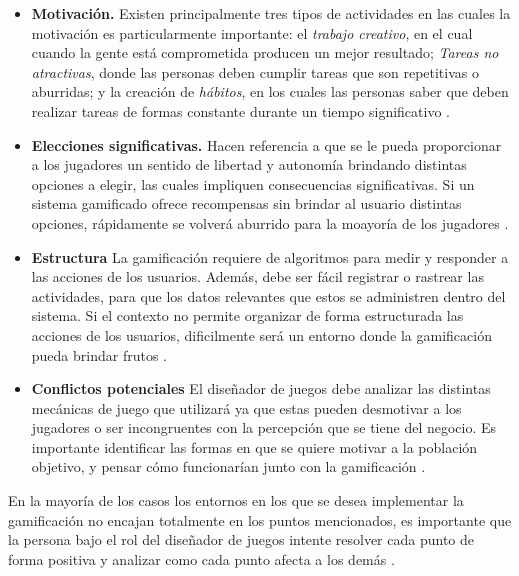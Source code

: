     \begin{itemize}
    \item
    {\bf Motivación.}
        Existen principalmente tres tipos de actividades en las cuales la motivación
        es particularmente importante: el {\em trabajo creativo}, en el cual cuando la gente
        está comprometida producen un mejor resultado; {\em Tareas no atractivas}, donde las
        personas deben cumplir tareas que son repetitivas o aburridas; y la creación de
        {\em hábitos}, en los cuales las personas saber que deben realizar tareas de formas
        constante durante un tiempo significativo \cite[p. 31]{ForTheWin}.
        \clearpage

    \item
    {\bf Elecciones significativas.}
        Hacen referencia a que se le pueda proporcionar a los jugadores un sentido de libertad
        y autonomía brindando distintas opciones a elegir, las cuales impliquen consecuencias
        significativas. Si un sistema gamificado ofrece recompensas sin brindar al usuario
        distintas opciones, rápidamente se volverá aburrido para la moayoría de los jugadores
        \cite[p. 32]{ForTheWin}.

    \item {\bf Estructura}
        La gamificación requiere de algoritmos para medir y responder a las acciones de los
        usuarios. Además, debe ser fácil registrar o rastrear las actividades, para que los
        datos relevantes que estos se administren dentro del sistema. Si el contexto no permite
        organizar de forma estructurada las acciones de los usuarios, dificilmente será un
        entorno donde la gamificación pueda brindar frutos \cite[p. 32]{ForTheWin}.

    \item {\bf Conflictos potenciales}
        El diseñador de juegos debe analizar las distintas mecánicas de juego que utilizará
        ya que estas pueden desmotivar a los jugadores o ser incongruentes con la percepción
        que se tiene del negocio. Es importante identificar las formas en que se quiere motivar
        a la población objetivo, y pensar cómo funcionarían junto con la gamificación
        \cite[p. 33]{ForTheWin}.

    \end{itemize}


    \noindent En la mayoría de los casos los entornos en los que se desea implementar la gamificación
    no encajan totalmente en los puntos mencionados, es importante que la persona bajo el rol del
    diseñador de juegos intente resolver cada punto de forma positiva y analizar como cada punto
    afecta a los demás \cite[p. 34]{ForTheWin}. 



